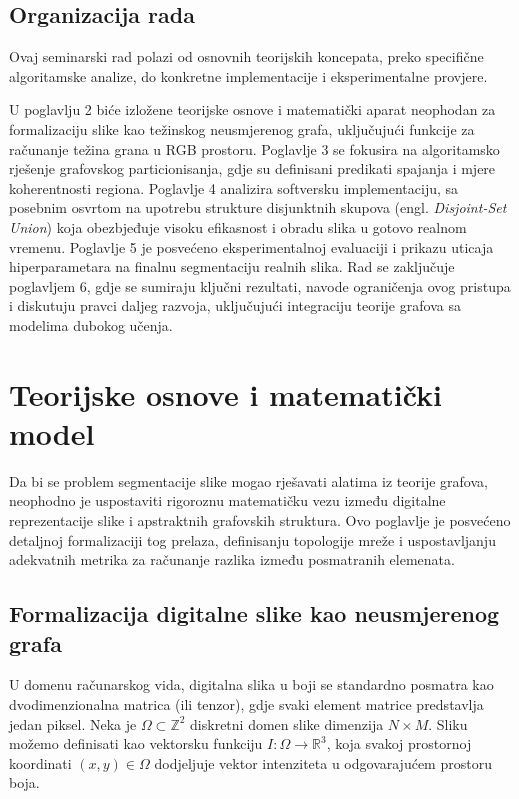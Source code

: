 \documentclass[11pt,a4paper]{article}
\begin{document}
\subsection{Organizacija rada}
Ovaj seminarski rad polazi od osnovnih teorijskih koncepata, preko specifične algoritamske analize, do konkretne implementacije i eksperimentalne provjere.

U poglavlju 2 biće izložene teorijske osnove i matematički aparat neophodan za formalizaciju slike kao težinskog neusmjerenog grafa, uključujući funkcije za računanje težina grana u RGB prostoru. Poglavlje 3 se fokusira na algoritamsko rješenje grafovskog particionisanja, gdje su definisani predikati spajanja i mjere koherentnosti regiona. Poglavlje 4 analizira softversku implementaciju, sa posebnim osvrtom na upotrebu strukture disjunktnih skupova (engl. \textit{Disjoint-Set Union}) koja obezbjeđuje visoku efikasnost i obradu slika u gotovo realnom vremenu. Poglavlje 5 je posvećeno eksperimentalnoj evaluaciji i prikazu uticaja hiperparametara na finalnu segmentaciju realnih slika. Rad se zaključuje poglavljem 6, gdje se sumiraju ključni rezultati, navode ograničenja ovog pristupa i diskutuju pravci daljeg razvoja, uključujući integraciju teorije grafova sa modelima dubokog učenja.


\section{Teorijske osnove i matematički model}

Da bi se problem segmentacije slike mogao rješavati alatima iz teorije grafova, neophodno je uspostaviti rigoroznu matematičku vezu između digitalne reprezentacije slike i apstraktnih grafovskih struktura. Ovo poglavlje je posvećeno detaljnoj formalizaciji tog prelaza, definisanju topologije mreže i uspostavljanju adekvatnih metrika za računanje razlika između posmatranih elemenata.

\subsection{Formalizacija digitalne slike kao neusmjerenog grafa}
U domenu računarskog vida, digitalna slika u boji se standardno posmatra kao dvodimenzionalna matrica (ili tenzor), gdje svaki element matrice predstavlja jedan piksel. Neka je $\Omega \subset \mathbb{Z}^2$ diskretni domen slike dimenzija $N \times M$. Sliku možemo definisati kao vektorsku funkciju $I: \Omega \rightarrow \mathbb{R}^3$, koja svakoj prostornoj koordinati $(x, y) \in \Omega$ dodjeljuje vektor intenziteta u odgovarajućem prostoru boja.
\end{document}
